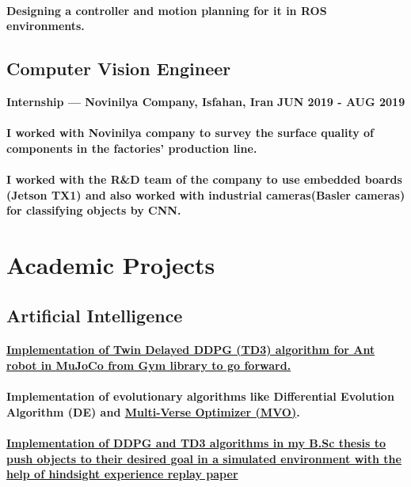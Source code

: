 \documentclass[a4paper]{article}
\begin{document}
        \paragraph{Designing a controller and motion planning for it in ROS environments.}
        \subsection{Computer Vision Engineer}
        {\bfseries\small Internship — Novinilya Company, Isfahan, Iran}
        \hfill
        {\bfseries\small JUN 2019 - AUG 2019}\nopagebreak
        
        \paragraph{I worked with Novinilya company to survey the surface quality of components in the factories'  production line.}
        \paragraph{I worked with the R\&D team of the company to use embedded boards (Jetson TX1) and also worked with industrial cameras(Basler cameras) for classifying objects by CNN.}

    \section{Academic Projects}

        \subsection{Artificial Intelligence}

            \paragraph{\href{https://github.com/ake1999/TD3_Ant_v4}{Implementation of Twin Delayed DDPG (TD3) algorithm for Ant robot in MuJoCo from Gym library to go forward.}}
            \paragraph{Implementation of evolutionary algorithms like Differential Evolution Algorithm (DE) and \href{https://github.com/ake1999/MVO_MATLAB}{Multi-Verse Optimizer (MVO)}.}
            \paragraph{\href{https://github.com/ake1999/aarm}{Implementation of DDPG and TD3 algorithms in my B.Sc thesis to push objects to their desired goal in a simulated environment with the help of hindsight experience replay paper}}
\end{document}
